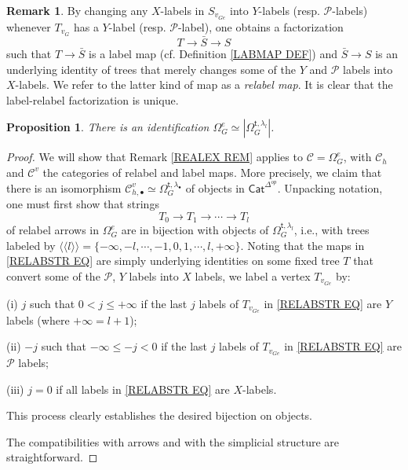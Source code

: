 \documentclass[a4paper,10pt
,draft
]{article}%
\numberwithin{equation}{section}
\numberwithin{figure}{section}
\newtheorem{proposition}[equation]{Proposition}%
\theoremstyle{definition} %
\newtheorem{remark}[equation]{Remark}%
\newcommand{\1}{\ensuremath{\mathbbm 1}}%
\begin{document}
\begin{remark}
By changing any $X$-labels in $S_{v_{G e}}$ 
into $Y$-labels (resp. $\mathcal{P}$-labels)
whenever $T_{v_{G}}$  has a 
$Y$-label (resp. $\mathcal{P}$-label), one obtains a factorization
\[ T \to \bar{S} \to S \]
such that $T \to \bar{S}$ is a label map 
(cf. Definition \ref{LABMAP DEF})
and $\bar{S} \to S$ is an underlying identity of trees that
merely changes some of the $Y$ and $\mathcal{P}$ labels into 
$X$-labels.
We refer to the latter kind of map as a \textit{relabel map}.
It is clear that the label-relabel factorization 
 is unique.
\end{remark}

\begin{proposition}
There is an identification
$\Omega_G^e \simeq 
|\Omega_{G}^{\mathsf{t},\lambda_l}|$.
\end{proposition}


\begin{proof}
We will show that Remark \ref{REALEX REM} applies to 
$\mathcal{C} = \Omega_G^e$,
with $\mathcal{C}_h$ and $\mathcal{C}^v$ the categories of 
relabel and label maps.
More precisely, we claim that there is an isomorphism 
$\mathcal{C}_{h,\bullet}^{v} \simeq 
\Omega_{G}^{\mathsf{t},\lambda_{\bullet}}$
of objects in $\mathsf{Cat}^{\Delta^{op}}$.
Unpacking notation, one must first show that strings
\begin{equation}\label{RELABSTR EQ}
T_0 \to T_1 \to \cdots \to T_l
\end{equation}
 of relabel arrows in $\Omega_G^e$
 are in bijection with objects of 
 $\Omega_{G}^{\mathsf{t},\lambda_l}$,
 i.e., with trees labeled by
 $\langle \langle l \rangle \rangle =
  \{-\infty, -l, \cdots, -1,0,1,\cdots,l,+ \infty\}$.
Noting that the maps in
\eqref{RELABSTR EQ}
are simply underlying identities on some fixed tree $T$
that convert some of the $\mathcal{P}$, $Y$ labels into $X$ labels,
we label a vertex $T_{v_{Ge}}$ by:
\begin{inparaenum}
\item[(i)]
$j$ such that
$0 < j \leq +\infty$
if the last $j$ labels of $T_{v_{Ge}}$ in 
\eqref{RELABSTR EQ} are $Y$ labels (where $+\infty = l+1$); 
\item[(ii)]
$-j$ such that
$-\infty \leq -j < 0$
if the last $j$ labels of $T_{v_{Ge}}$ in 
\eqref{RELABSTR EQ} are $\mathcal{P}$ labels;
\item[(iii)] $j=0$ if all labels in \eqref{RELABSTR EQ}
are $X$-labels.
\end{inparaenum}
 This process clearly establishes the desired bijection on objects.

The compatibilities with arrows and with the simplicial structure are straightforward.
\end{proof}
\end{document}
